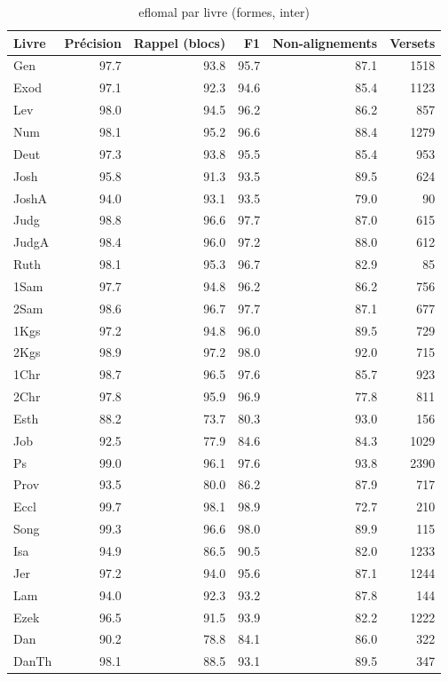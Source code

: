 \begin{table}[ht]
\centering
\caption{eflomal par livre (formes, inter)}
\label{tab:eflomal_par_livre_formes_inter}
\begin{tabular}{lrrrrr}
\toprule
Livre & Précision & Rappel (blocs) & F1 & Non-alignements & Versets \\
\midrule
Gen & 97.7 & 93.8 & 95.7 & 87.1 & 1518 \\
Exod & 97.1 & 92.3 & 94.6 & 85.4 & 1123 \\
Lev & 98.0 & 94.5 & 96.2 & 86.2 & 857 \\
Num & 98.1 & 95.2 & 96.6 & 88.4 & 1279 \\
Deut & 97.3 & 93.8 & 95.5 & 85.4 & 953 \\
Josh & 95.8 & 91.3 & 93.5 & 89.5 & 624 \\
JoshA & 94.0 & 93.1 & 93.5 & 79.0 & 90 \\
Judg & 98.8 & 96.6 & 97.7 & 87.0 & 615 \\
JudgA & 98.4 & 96.0 & 97.2 & 88.0 & 612 \\
Ruth & 98.1 & 95.3 & 96.7 & 82.9 & 85 \\
1Sam & 97.7 & 94.8 & 96.2 & 86.2 & 756 \\
2Sam & 98.6 & 96.7 & 97.7 & 87.1 & 677 \\
1Kgs & 97.2 & 94.8 & 96.0 & 89.5 & 729 \\
2Kgs & 98.9 & 97.2 & 98.0 & 92.0 & 715 \\
1Chr & 98.7 & 96.5 & 97.6 & 85.7 & 923 \\
2Chr & 97.8 & 95.9 & 96.9 & 77.8 & 811 \\
Esth & 88.2 & 73.7 & 80.3 & 93.0 & 156 \\
Job & 92.5 & 77.9 & 84.6 & 84.3 & 1029 \\
Ps & 99.0 & 96.1 & 97.6 & 93.8 & 2390 \\
Prov & 93.5 & 80.0 & 86.2 & 87.9 & 717 \\
Eccl & 99.7 & 98.1 & 98.9 & 72.7 & 210 \\
Song & 99.3 & 96.6 & 98.0 & 89.9 & 115 \\
Isa & 94.9 & 86.5 & 90.5 & 82.0 & 1233 \\
Jer & 97.2 & 94.0 & 95.6 & 87.1 & 1244 \\
Lam & 94.0 & 92.3 & 93.2 & 87.8 & 144 \\
Ezek & 96.5 & 91.5 & 93.9 & 82.2 & 1222 \\
Dan & 90.2 & 78.8 & 84.1 & 86.0 & 322 \\
DanTh & 98.1 & 88.5 & 93.1 & 89.5 & 347 \\

\end{tabular}
\end{table}
